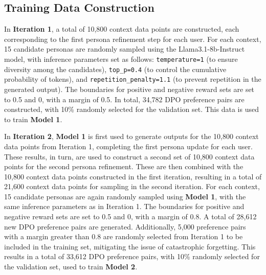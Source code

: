 \subsection{Training Data Construction}
In \textbf{Iteration 1}, a total of 10,800 
context data points are constructed, 
each corresponding to the first persona refinement step for each user. 
For each context, 15 candidate personas are randomly sampled using the 
Llama3.1-8b-Instruct model, with inference parameters set as follows: 
\texttt{temperature=1} (to ensure diversity among the candidates), 
\texttt{top\_p=0.4} (to control the cumulative probability of tokens), 
and \texttt{repetition\_penalty=1.1} (to prevent repetition in the generated output). 
The boundaries for positive and negative reward sets are set to 0.5 and 0, 
with a margin of 0.5. In total, 34,782 DPO preference pairs are constructed, 
with 10\% randomly selected for the validation set. This data is used to train 
\textbf{Model 1}.

In \textbf{Iteration 2}, \textbf{Model 1} is first used to generate outputs for the 10,800 context data points from Iteration 1, completing the first persona update for each user. These results, in turn, are used to construct a second set of 10,800 context data points for the second persona refinement. These are then combined with the 10,800 context data points constructed in the first iteration, resulting in a total of 21,600 context data points for sampling in the second iteration. For each context, 15 candidate personas are again randomly sampled using \textbf{Model 1}, with the same inference parameters as in Iteration 1. The boundaries for positive and negative reward sets are set to 0.5 and 0, with a margin of 0.8. A total of 28,612 new DPO preference pairs are generated. Additionally, 5,000 preference pairs with a margin greater than 0.8 are randomly selected from Iteration 1 to be included in the training set, mitigating the issue of catastrophic forgetting. This results in a total of 33,612 DPO preference pairs, with 10\% randomly selected for the validation set, used to train \textbf{Model 2}.



